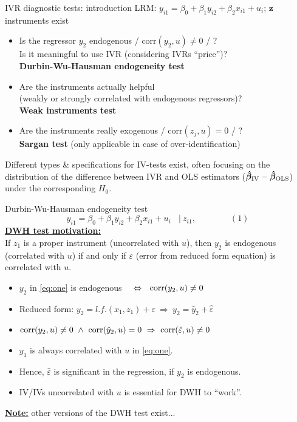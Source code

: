 \documentclass[usenames,dvipsnames]{beamer}
\begin{document}
\begin{frame}{IVR diagnostic tests: introduction}
LRM: $y_{i1}=\beta_0+\beta_1 y_{i2}+\beta_2 x_{i1}+u_i$; \quad $\bm{z}$ instruments exist
\medskip
\begin{itemize}
\item Is the regressor $y_2$ endogenous / $\mathrm{corr}(y_2, u) \neq 0$ / ? \\
Is it meaningful to use IVR (considering IVRs ``price'')?\\
\textbf{Durbin-Wu-Hausman endogeneity test}\\
\item Are the instruments actually helpful\\
(weakly or strongly correlated with endogenous regressors)? \\
\textbf{Weak instruments test}\\
\item Are the instruments really exogenous / $\mathrm{corr}(z_j, u)=0$ / ?\\
\textbf{Sargan test} (only applicable in case of over-identification)\\
\end{itemize}
\medskip
\small Different types \& specifications for IV-tests exist, often focusing on the distribution of the difference between IVR and OLS estimators ($\bm{\hat{\beta}}_{\textnormal{IV}}-\bm{\hat{\beta}}_{\textnormal{OLS}}$) under the corresponding $H_0$.
\end{frame}
\begin{frame}{Durbin-Wu-Hausman endogeneity test}
$$y_{i1}=\beta_0+\beta_1 y_{i2} + \beta_2 x_{i1} +  u_i ~~~~|~z_{i1}, \qquad \qquad (1)$$
\medskip
\textbf{\underline{DWH test motivation:}} \\If $z_1$ is a proper instrument (uncorrelated with $u$), then $y_2$ is endogenous (correlated with $u$) if and only if $\varepsilon$ (error from reduced form equation) is correlated with $u$. \\
\medskip
\begin{itemize}
\item $y_2$ in \eqref{eq:one} is endogenous ~~$\Leftrightarrow ~~\textnormal{corr}(y_2,u)\neq0$
\item Reduced form: $y_2 = \textit{l.f.}(x_1, z_1) + \varepsilon ~\Rightarrow~ y_2 = \hat{y}_2 + \hat{\varepsilon}$
\item $\textnormal{corr}(y_2,u)\neq0 ~\wedge~\textnormal{corr}(\hat{y}_2,u) = 0 ~\Rightarrow~ \textnormal{corr}(\hat{\varepsilon},u)\neq0 $
\item $y_1$ is always correlated with $u$ in \eqref{eq:one}. 
\item Hence, $\hat{\varepsilon}$ is significant in the regression, if $y_2$ is endogenous.
\item IV/IVs uncorrelated with $u$ is essential for DWH to ``work''.
\end{itemize}
\bigskip
\textbf{\underline{Note:}} other versions of the DWH test exist...
\end{frame}
\end{document}
